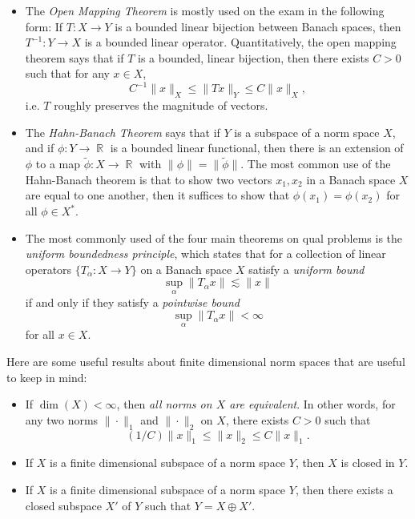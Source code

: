 \documentclass{exam}
\DeclareMathOperator{\RR}{\mathbb{R}}
\theoremstyle{problemstyle}
\newcommand{\1}[1]{\textbf{1}_{\left[#1\right]}} %
\begin{document}
\begin{questions}
\begin{itemize}
	\item The \emph{Open Mapping Theorem} is mostly used on the exam in the following form: If $T: X \to Y$ is a bounded linear bijection between Banach spaces, then $T^{-1}: Y \to X$ is a bounded linear operator. Quantitatively, the open mapping theorem says that if $T$ is a bounded, linear bijection, then there exists $C > 0$ such that for any $x \in X$,
	\[ C^{-1} \| x \|_X \leq \| Tx \|_Y \leq C \| x \|_X, \]
	i.e. $T$ roughly preserves the magnitude of vectors.

	\item The \emph{Hahn-Banach Theorem} says that if $Y$ is a subspace of a norm space $X$, and if $\phi: Y \to \RR$ is a bounded linear functional, then there is an extension of $\phi$ to a map $\tilde{\phi}: X \to \RR$ with $\| \phi \| = \| \tilde{\phi} \|$. The most common use of the Hahn-Banach theorem is that to show two vectors $x_1,x_2$ in a Banach space $X$ are equal to one another, then it suffices to show that $\phi(x_1) = \phi(x_2)$ for all $\phi \in X^*$.

	\item The most commonly used of the four main theorems on qual problems is the \emph{uniform boundedness principle}, which states that for a collection of linear operators $\{ T_\alpha: X \to Y \}$ on a Banach space $X$ satisfy a \emph{uniform bound}
	\[ \sup_\alpha \| T_\alpha x \| \lesssim \| x \| \]
	if and only if they satisfy a \emph{pointwise bound}
	\[ \sup_\alpha \| T_\alpha x \| < \infty \]
	for all $x \in X$.
\end{itemize}

Here are some useful results about finite dimensional norm spaces that are useful to keep in mind:
%
\begin{itemize}
	\item If $\dim(X) < \infty$, then \emph{all norms on $X$ are equivalent}. In other words, for any two norms $\| \cdot \|_1$ and $\| \cdot \|_2$ on $X$, there exists $C > 0$ such that
	\[ (1/C) \| x \|_1 \leq \| x \|_2 \leq C \| x \|_1. \]

	\item If $X$ is a finite dimensional subspace of a norm space $Y$, then $X$ is closed in $Y$.

	\item If $X$ is a finite dimensional subspace of a norm space $Y$, then there exists a closed subspace $X'$ of $Y$ such that $Y = X \oplus X'$.
\end{itemize}





\end{questions}
\end{document}
